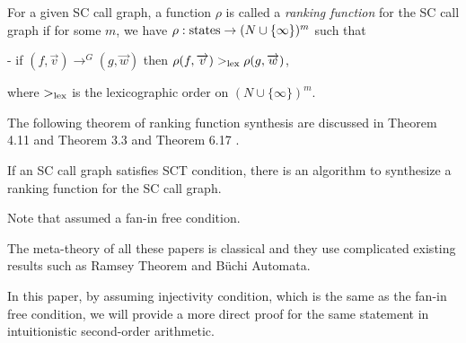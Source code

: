 \begin{Def}\rm
For a given SC call graph, a function $\rho$ is called
a {\em ranking function} for the SC call graph 
if for some $m$, we have
$\rho: \hbox{states} \to (N \cup \{\infty\})^m$
such that

- if $(f, \Vec v) \to^G (g, \Vec w)$
then $\rho(f, \overrightarrow v) >_{\rm lex} \rho(g, \overrightarrow w)$,

\noindent
where $>_{\rm lex}$ is the lexicographic order on $(N \cup \{\infty\})^m$.
\end{Def}

The following theorem of ranking function synthesis are discussed 
in Theorem 4.11 \cite{Lee09} and Theorem 3.3 \cite{Benamram09} and
Theorem 6.17 \cite{Benamram10}.

\begin{Th}
If an SC call graph satisfies SCT condition,
there is an algorithm to synthesize a ranking function
for the SC call graph.
\end{Th}
Note that \cite{Benamram09} assumed a fan-in free condition.

The meta-theory of all these papers is classical and they use
complicated existing results such as Ramsey Theorem and B\"uchi Automata.

In this paper, 
by assuming injectivity condition, which is the same as the fan-in free condition,
we will provide a more direct proof for the same statement in
intuitionistic second-order arithmetic.

